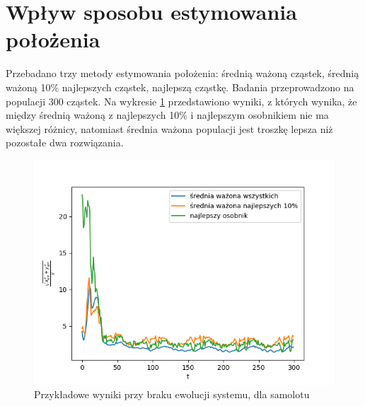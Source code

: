
\section{Wpływ sposobu estymowania położenia}
Przebadano trzy metody estymowania położenia: średnią ważoną cząstek, średnią ważoną 10\% najlepszych cząstek, najlepszą cząstkę. Badania przeprowadzono na populacji 300 cząstek. Na wykresie \ref{wplyw_est} przedstawiono wyniki, z których wynika, że między średnią ważoną z najlepszych 10\% i najlepszym osobnikiem nie ma większej różnicy, natomiast średnia ważona populacji jest troszkę lepsza niż pozostałe dwa rozwiązania.

\begin{figure}[H]
	\begin{center}
		\includegraphics[width=12cm]{./wplyw_est.png}
		\caption{Przykładowe wyniki przy braku ewolucji systemu, dla samolotu}
		\label{wplyw_est}
	\end{center}
\end{figure}



